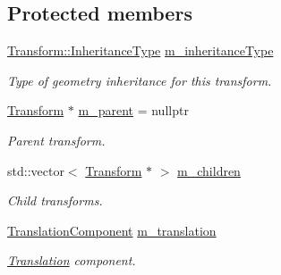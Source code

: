 \subsection*{Protected members}
\begin{DoxyCompactItemize}
\item 
\mbox{\label{classrev_1_1_transform_a90d5cb9ed1390f13279ce918f146b970}} 
\mbox{\hyperlink{classrev_1_1_transform_a0945b935b8f5fbf95920720ac8874e93}{Transform\+::\+Inheritance\+Type}} \mbox{\hyperlink{classrev_1_1_transform_a90d5cb9ed1390f13279ce918f146b970}{m\+\_\+inheritance\+Type}}
\begin{DoxyCompactList}\small\item\em Type of geometry inheritance for this transform. \end{DoxyCompactList}\item 
\mbox{\label{classrev_1_1_transform_a7cd5afa681ae54115efd969a4831a331}} 
\mbox{\hyperlink{classrev_1_1_transform}{Transform}} $\ast$ \mbox{\hyperlink{classrev_1_1_transform_a7cd5afa681ae54115efd969a4831a331}{m\+\_\+parent}} = nullptr
\begin{DoxyCompactList}\small\item\em Parent transform. \end{DoxyCompactList}\item 
\mbox{\label{classrev_1_1_transform_a204bf0d45564bece70b3e2f832d5f3eb}} 
std\+::vector$<$ \mbox{\hyperlink{classrev_1_1_transform}{Transform}} $\ast$ $>$ \mbox{\hyperlink{classrev_1_1_transform_a204bf0d45564bece70b3e2f832d5f3eb}{m\+\_\+children}}
\begin{DoxyCompactList}\small\item\em Child transforms. \end{DoxyCompactList}\item 
\mbox{\label{classrev_1_1_transform_a2637245e67af8355d099b6daebf1ecd5}} 
\mbox{\hyperlink{classrev_1_1_translation_component}{Translation\+Component}} \mbox{\hyperlink{classrev_1_1_transform_a2637245e67af8355d099b6daebf1ecd5}{m\+\_\+translation}}
\begin{DoxyCompactList}\small\item\em \mbox{\hyperlink{structrev_1_1_translation}{Translation}} component. \end{DoxyCompactList}\item 

\end{DoxyCompactItemize}
